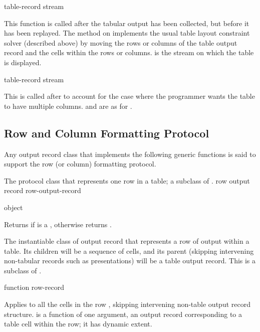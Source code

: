  {table-record stream}

This function is called after the tabular output has been collected, but before
it has been replayed.  The method on 
implements the usual table layout constraint solver (described above) by moving
the rows or columns of the table output record  and the cells
within the rows or columns.     is the stream on which the table is
displayed.

 {table-record stream}

This is called after  to account for the case where the
programmer wants the table to have multiple columns.   and
 are as for .


\subsection {Row and Column Formatting Protocol}

Any output record class that implements the following generic functions is said
to support the row (or column) formatting protocol.


The protocol class that represents one row in a table; a subclass of
.
 {row output record} {row-output-record}

 {object}

Returns  if  is a , otherwise
returns .


The instantiable class of output record that represents a row of output within a
table.  Its children will be a sequence of cells, and its parent (skipping
intervening non-tabular records such as presentations) will be a table output
record.  This is a subclass of .

 {function row-record}

Applies  to all the cells in the row , skipping
intervening non-table output record structure.   is a function of
one argument, an output record corresponding to a table cell within the row; it
has dynamic extent.

